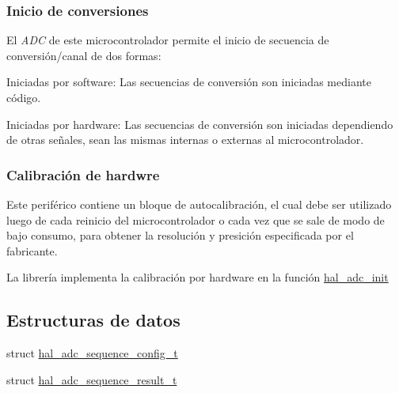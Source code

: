 \subsubsection*{Inicio de conversiones}

El {\itshape A\+DC} de este microcontrolador permite el inicio de secuencia de conversión/canal de dos formas\+:
\begin{DoxyEnumerate}
\item Iniciadas por software\+: Las secuencias de conversión son iniciadas mediante código.
\item Iniciadas por hardware\+: Las secuencias de conversión son iniciadas dependiendo de otras señales, sean las mismas internas o externas al microcontrolador.
\end{DoxyEnumerate}\subsubsection*{Calibración de hardwre}

Este periférico contiene un bloque de autocalibración, el cual debe ser utilizado luego de cada reinicio del microcontrolador o cada vez que se sale de modo de bajo consumo, para obtener la resolución y presición especificada por el fabricante.

La librería implementa la calibración por hardware en la función \hyperlink{group__ADC_gad44f4eb2585a9292ff4b66ceceb2f75f}{hal\+\_\+adc\+\_\+init} \subsection*{Estructuras de datos}
\begin{DoxyCompactItemize}
\item 
struct \hyperlink{structhal__adc__sequence__config__t}{hal\+\_\+adc\+\_\+sequence\+\_\+config\+\_\+t}
\item 
struct \hyperlink{group__ADC_structhal__adc__sequence__result__t}{hal\+\_\+adc\+\_\+sequence\+\_\+result\+\_\+t}
\end{DoxyCompactItemize}
